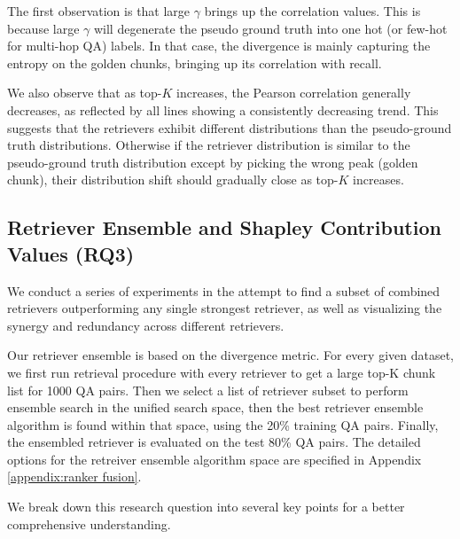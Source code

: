 \documentclass{article}
\theoremstyle{plain}
\theoremstyle{definition}
\theoremstyle{remark}
\begin{document}
The first observation is that large $\gamma$ brings up the correlation values. This is because large $\gamma$ will degenerate the pseudo ground truth into one hot (or few-hot for multi-hop QA) labels. In that case, the divergence is mainly capturing the entropy on the golden chunks, bringing up its correlation with recall.


We also observe that as top-$K$ increases, the Pearson correlation generally decreases, as reflected by all lines showing a consistently decreasing trend. This suggests that the retrievers exhibit different distributions than the pseudo-ground truth distributions. Otherwise if the retriever distribution is similar to the pseudo-ground truth distribution except by picking the wrong peak (golden chunk), their distribution shift should gradually close as top-$K$ increases.




\subsection{Retriever Ensemble and Shapley Contribution Values (\textbf{RQ3})}

We conduct a series of experiments in the attempt to find a subset of combined retrievers outperforming any single strongest retriever, as well as visualizing the synergy and redundancy across different retrievers.

Our retriever ensemble is based on the divergence metric. For every given dataset, we first run retrieval procedure with every retriever to get a large top-K chunk list for 1000 QA pairs. Then we select a list of retriever subset to perform ensemble search in the unified search space, then the best retriever ensemble algorithm is found within that space, using the 20\% training QA pairs. Finally, the ensembled retriever is evaluated on the test 80\% QA pairs. The detailed options for the retreiver ensemble algorithm space are specified in Appendix \ref{appendix:ranker fusion}.

We break down this research question into several key points for a better comprehensive understanding.
\end{document}
